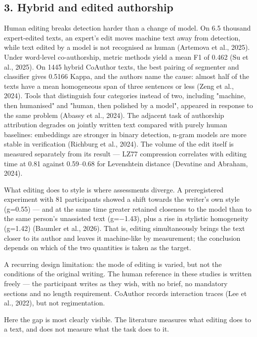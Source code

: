 \documentclass[11pt,a4paper]{article}
\renewcommand{\_}{\textunderscore\allowbreak}
\begin{document}
\subsection{3. Hybrid and edited authorship}

Human editing breaks detection harder than a change of model. On 6.5 thousand
expert-edited texts, an expert's edit moves machine text away from detection,
while text edited by a model is not recognised as human (Artemova et al., 2025).
Under word-level co-authorship, metric methods yield a mean F1 of 0.462
(Su et al., 2025). On 1445 hybrid CoAuthor texts, the best pairing of segmenter and
classifier gives 0.5166 Kappa, and the authors name the cause: almost half of the
texts have a mean homogeneous span of three sentences or less (Zeng et al., 2024).
Tools that distinguish four categories instead of two, including "machine, then
humanised" and "human, then polished by a model", appeared in response to the
same problem (Abassy et al., 2024). The adjacent task of authorship attribution degrades
on jointly written text compared with purely human baselines:
embeddings are stronger in binary detection, n-gram models are more stable in
verification (Richburg et al., 2024). The volume of the edit itself is measured separately from its result —
LZ77 compression correlates with editing time at 0.81 against 0.59–0.68 for
Levenshtein distance (Devatine and Abraham, 2024).

What editing does to style is where assessments diverge. A preregistered
experiment with 81 participants showed a shift towards the writer's own style (g=0.55) — and
at the same time greater retained closeness to the model than to the same
person's unassisted text (g=$-$1.43), plus a rise in stylistic homogeneity
(g=1.42) (Baumler et al., 2026). That is, editing simultaneously brings the text closer to its author and
leaves it machine-like by measurement; the conclusion depends on which of the two
quantities is taken as the target.

A recurring design limitation: the mode of editing is varied, but not the
conditions of the original writing. The human reference in these studies is
written freely — the participant writes as they wish, with no brief, no mandatory
sections and no length requirement. CoAuthor records interaction traces (Lee et al., 2022), but not regimentation.

Here the gap is most clearly visible. The literature measures what editing does
to a text, and does not measure what the task does to it.
\end{document}
